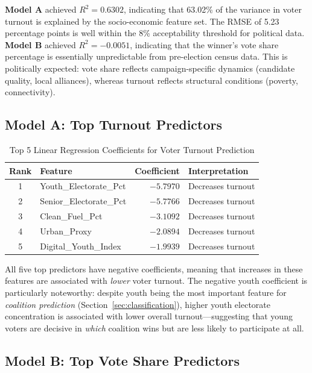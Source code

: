 \documentclass[12pt, a4paper]{article}
\begin{document}
\textbf{Model A} achieved $R^2 = 0.6302$, indicating that 63.02\% of the variance in voter turnout is explained by the socio-economic feature set. The RMSE of 5.23 percentage points is well within the 8\% acceptability threshold for political data. \textbf{Model B} achieved $R^2 = -0.0051$, indicating that the winner's vote share percentage is essentially unpredictable from pre-election census data. This is politically expected: vote share reflects campaign-specific dynamics (candidate quality, local alliances), whereas turnout reflects structural conditions (poverty, connectivity).

\subsection{Model A: Top Turnout Predictors}

\begin{table}[H]
\centering
\caption{Top 5 Linear Regression Coefficients for Voter Turnout Prediction}
\label{tab:turnout_coeff}
\begin{tabular}{c l r l}
\toprule
\textbf{Rank} & \textbf{Feature} & \textbf{Coefficient} & \textbf{Interpretation} \\
\midrule
1 & Youth\_Electorate\_Pct & $-5.7970$ & Decreases turnout \\
2 & Senior\_Electorate\_Pct & $-5.7766$ & Decreases turnout \\
3 & Clean\_Fuel\_Pct & $-3.1092$ & Decreases turnout \\
4 & Urban\_Proxy & $-2.0894$ & Decreases turnout \\
5 & Digital\_Youth\_Index & $-1.9939$ & Decreases turnout \\
\bottomrule
\end{tabular}
\end{table}

All five top predictors have negative coefficients, meaning that increases in these features are associated with \emph{lower} voter turnout. The negative youth coefficient is particularly noteworthy: despite youth being the most important feature for \emph{coalition prediction} (Section~\ref{sec:classification}), higher youth electorate concentration is associated with lower overall turnout---suggesting that young voters are decisive in \emph{which} coalition wins but are less likely to participate at all.

\subsection{Model B: Top Vote Share Predictors}
\end{document}
